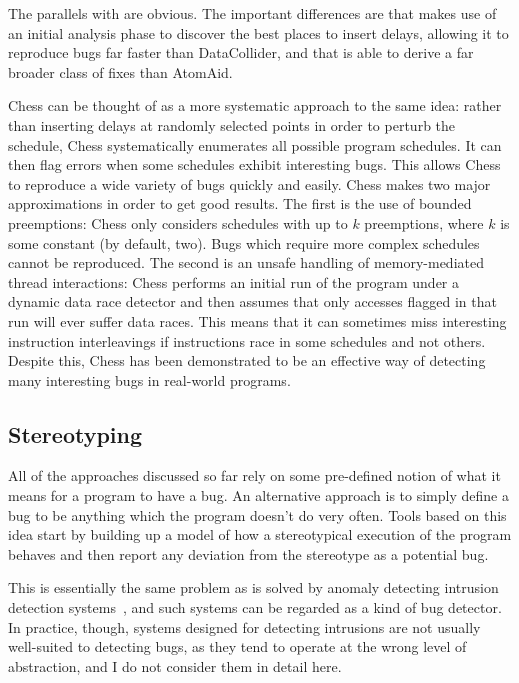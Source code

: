 The parallels with {\technique} are obvious.  The important
differences are that {\technique} makes use of an initial analysis
phase to discover the best places to insert delays, allowing it to
reproduce bugs far faster than DataCollider, and that {\technique}
is able to derive a far broader class of fixes than AtomAid.

Chess\cite{Musuvathi2008} can be thought of as a more systematic
approach to the same idea: rather than inserting delays at randomly
selected points in order to perturb the schedule, Chess systematically
enumerates all possible program schedules.  It can then flag errors
when some schedules exhibit interesting bugs.  This allows Chess to
reproduce a wide variety of bugs quickly and easily.  Chess makes two
major approximations in order to get good results.  The first is the
use of bounded preemptions\cite{Musuvathi2007}: Chess only considers
schedules with up to $k$ preemptions, where $k$ is some constant (by
default, two).  Bugs which require more complex schedules cannot be
reproduced.  The second is an unsafe handling of memory-mediated
thread interactions: Chess performs an initial run of the program
under a dynamic data race detector and then assumes that only accesses
flagged in that run will ever suffer data races.  This means that it
can sometimes miss interesting instruction interleavings if
instructions race in some schedules and not others.  Despite this,
Chess has been demonstrated to be an effective way of detecting many
interesting bugs in real-world programs.

\subsection{Stereotyping}

All of the approaches discussed so far rely on some pre-defined notion
of what it means for a program to have a bug.  An alternative approach
is to simply define a bug to be anything which the program doesn't do
very often.  Tools based on this idea start by building up a model of
how a stereotypical execution of the program behaves and then report
any deviation from the stereotype as a potential bug.

This is essentially the same problem as is solved by anomaly detecting
intrusion detection systems~\cite{Forrest1996a}, and such systems can
be regarded as a kind of bug detector.  In practice, though, systems
designed for detecting intrusions are not usually well-suited to
detecting bugs, as they tend to operate at the wrong level of
abstraction, and I do not consider them
in detail here.

